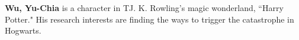 \begin{vita}%

{\bf Wu, Yu-Chia} is a character in TJ. K. Rowling's magic wonderland, ``Harry Potter." His research interests are finding the ways to trigger the catastrophe in Hogwarts.

\end{vita}